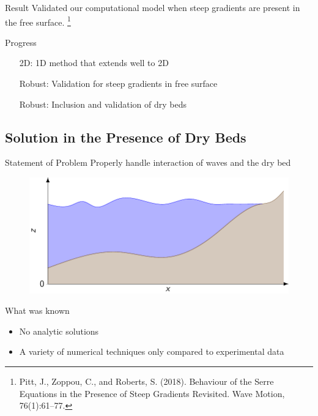 \documentclass[]{beamer}
\begin{document}
\begin{frame}{Result}
	Validated our computational model when steep gradients are present in the free surface. \footnote{Pitt, J., Zoppou, C., and Roberts, S. (2018).
		Behaviour of the Serre Equations in the Presence of Steep
		Gradients Revisited.
		Wave Motion, 76(1):61–77.}
\end{frame}

\begin{frame}{Progress}
	\begin{itemize}
		\item[2D:] 1D method that extends well to 2D \checkmark
		\item[Robust:] Validation for steep gradients in free surface \checkmark
		\item[Robust:] Inclusion and validation of dry beds
	\end{itemize}
\end{frame}

\subsection{Solution in the Presence of Dry Beds}
\begin{frame}{Statement of Problem}
	Properly handle interaction of waves and the dry bed
		\begin{figure}
			\includegraphics[width=\textwidth]{./Pics/WaterModelDiagrams/FressSurface.pdf}
		\end{figure}
\end{frame}

\begin{frame}{What was known}
	\begin{itemize}
		\item No analytic solutions
		\item A variety of numerical techniques only compared to experimental data
	\end{itemize}
\end{frame}
\end{document}

